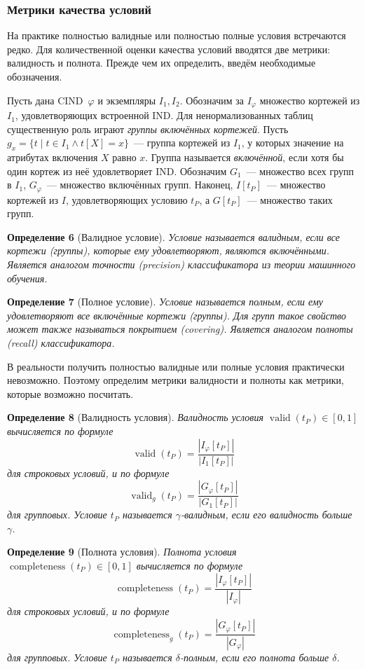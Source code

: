 \subsubsection{Метрики качества условий}

На практике полностью валидные или полностью полные условия встречаются редко. Для количественной оценки качества условий вводятся две метрики: валидность и полнота. Прежде чем их определить, введём необходимые обозначения.

Пусть дана CIND~$\varphi$ и экземпляры $I_1, I_2$. Обозначим за $I_\varphi$ множество кортежей из $I_1$, удовлетворяющих встроенной IND. Для ненормализованных таблиц существенную роль играют \emph{группы включённых кортежей}. Пусть $g_x = \{t \mid t \in I_1 \wedge t[X] = x\}$~--- группа кортежей из $I_1$, у которых значение на атрибутах включения $X$ равно $x$. Группа называется \emph{включённой}, если хотя бы один кортеж из неё удовлетворяет IND. Обозначим $G_1$~--- множество всех групп в $I_1$, $G_\varphi$~--- множество включённых групп. Наконец, $I[t_P]$~--- множество кортежей из $I$, удовлетворяющих условию $t_P$, а $G[t_P]$~--- множество таких групп.

\textbf{Определение 6} (Валидное условие). \emph{Условие называется валидным, если все кортежи (группы), которые ему удовлетворяют, являются включёнными. Является аналогом точности (precision) классификатора из теории машинного обучения.}

\textbf{Определение 7} (Полное условие). \emph{Условие называется полным, если ему удовлетворяют все включённые кортежи (группы). Для групп такое свойство может также называться покрытием (covering). Является аналогом полноты (recall) классификатора.}

В реальности получить полностью валидные или полные условия практически невозможно. Поэтому определим метрики валидности и полноты как метрики, которые возможно посчитать.

\textbf{Определение 8} (Валидность условия). \emph{Валидность условия $\operatorname{valid}(t_P) \in [0, 1]$ вычисляется по формуле}
\[
\operatorname{valid}(t_P) = \frac{|I_\varphi[t_P]|}{|I_1[t_P]|}
\]
\emph{для строковых условий, и по формуле}
\[
\operatorname{valid}_g(t_P) = \frac{|G_\varphi[t_P]|}{|G_1[t_P]|}
\]
\emph{для групповых. Условие $t_P$ называется $\gamma$-валидным, если его валидность больше $\gamma$.}

\textbf{Определение 9} (Полнота условия). \emph{Полнота условия $\operatorname{completeness}(t_P) \in [0, 1]$ вычисляется по формуле}
\[
\operatorname{completeness}(t_P) = \frac{|I_\varphi[t_P]|}{|I_\varphi|}
\]
\emph{для строковых условий, и по формуле}
\[
\operatorname{completeness}_g(t_P) = \frac{|G_\varphi[t_P]|}{|G_\varphi|}
\]
\emph{для групповых. Условие $t_P$ называется $\delta$-полным, если его полнота больше $\delta$.}

